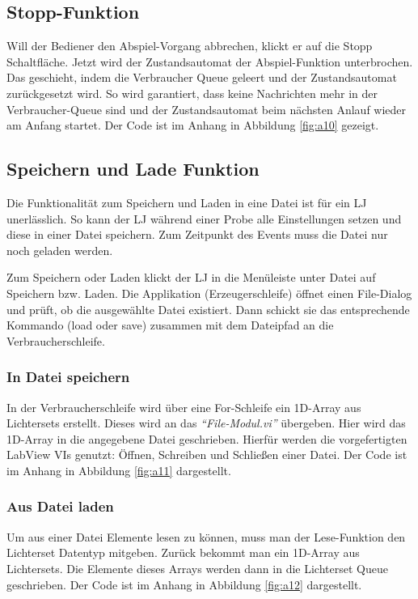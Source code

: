 \subsection{Stopp-Funktion}
Will der Bediener den Abspiel-Vorgang abbrechen, klickt er auf die Stopp Schaltfläche. Jetzt wird der Zustandsautomat der Abspiel-Funktion unterbrochen. 
Das geschieht, indem die Verbraucher Queue geleert und der Zustandsautomat zurückgesetzt wird. 
So wird garantiert, dass keine Nachrichten mehr in der Verbraucher-Queue sind und der Zustandsautomat beim nächsten Anlauf wieder am Anfang startet. 
Der Code ist im Anhang in Abbildung \ref{fig:a10} gezeigt.
		
		
\subsection{Speichern und Lade Funktion}
Die Funktionalität zum Speichern und Laden in eine Datei ist für ein LJ unerlässlich. 
So kann der LJ während einer Probe alle Einstellungen setzen und diese in einer Datei speichern. 
Zum Zeitpunkt des Events muss die Datei nur noch geladen werden. 

Zum Speichern oder Laden klickt der LJ in die Menüleiste unter Datei auf Speichern bzw. Laden. Die Applikation (Erzeugerschleife) öffnet einen File-Dialog 
und prüft, ob die ausgewählte Datei existiert. 
Dann schickt sie das entsprechende Kommando (load oder save) zusammen mit dem Dateipfad an die Verbraucherschleife.

\subsubsection{In Datei speichern}
In der Verbraucherschleife wird über eine For-Schleife ein 1D-Array aus Lichtersets erstellt. Dieses wird an das \textit{"`File-Modul.vi"'} übergeben. 
Hier wird das 1D-Array in die angegebene Datei geschrieben. 
Hierfür werden die vorgefertigten LabView VIs genutzt: Öffnen, Schreiben und Schließen einer Datei. Der Code ist im Anhang in Abbildung \ref{fig:a11} dargestellt.

\subsubsection{Aus Datei laden}
Um aus einer Datei Elemente lesen zu können, muss man der Lese-Funktion den Lichterset Datentyp mitgeben. 
Zurück bekommt man ein 1D-Array aus Lichtersets. Die Elemente dieses Arrays werden dann in die Lichterset Queue geschrieben. 
Der Code ist im Anhang in Abbildung \ref{fig:a12} dargestellt.


